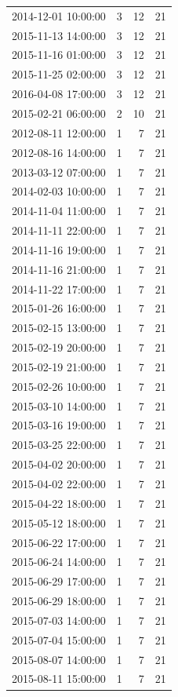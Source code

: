\begin{tabular}{lrrr}
2014-12-01 10:00:00 & 3 & 12 & 21 \\
2015-11-13 14:00:00 & 3 & 12 & 21 \\
2015-11-16 01:00:00 & 3 & 12 & 21 \\
2015-11-25 02:00:00 & 3 & 12 & 21 \\
2016-04-08 17:00:00 & 3 & 12 & 21 \\
2015-02-21 06:00:00 & 2 & 10 & 21 \\
2012-08-11 12:00:00 & 1 & 7 & 21 \\
2012-08-16 14:00:00 & 1 & 7 & 21 \\
2013-03-12 07:00:00 & 1 & 7 & 21 \\
2014-02-03 10:00:00 & 1 & 7 & 21 \\
2014-11-04 11:00:00 & 1 & 7 & 21 \\
2014-11-11 22:00:00 & 1 & 7 & 21 \\
2014-11-16 19:00:00 & 1 & 7 & 21 \\
2014-11-16 21:00:00 & 1 & 7 & 21 \\
2014-11-22 17:00:00 & 1 & 7 & 21 \\
2015-01-26 16:00:00 & 1 & 7 & 21 \\
2015-02-15 13:00:00 & 1 & 7 & 21 \\
2015-02-19 20:00:00 & 1 & 7 & 21 \\
2015-02-19 21:00:00 & 1 & 7 & 21 \\
2015-02-26 10:00:00 & 1 & 7 & 21 \\
2015-03-10 14:00:00 & 1 & 7 & 21 \\
2015-03-16 19:00:00 & 1 & 7 & 21 \\
2015-03-25 22:00:00 & 1 & 7 & 21 \\
2015-04-02 20:00:00 & 1 & 7 & 21 \\
2015-04-02 22:00:00 & 1 & 7 & 21 \\
2015-04-22 18:00:00 & 1 & 7 & 21 \\
2015-05-12 18:00:00 & 1 & 7 & 21 \\
2015-06-22 17:00:00 & 1 & 7 & 21 \\
2015-06-24 14:00:00 & 1 & 7 & 21 \\
2015-06-29 17:00:00 & 1 & 7 & 21 \\
2015-06-29 18:00:00 & 1 & 7 & 21 \\
2015-07-03 14:00:00 & 1 & 7 & 21 \\
2015-07-04 15:00:00 & 1 & 7 & 21 \\
2015-08-07 14:00:00 & 1 & 7 & 21 \\
2015-08-11 15:00:00 & 1 & 7 & 21 \\

\end{tabular}
